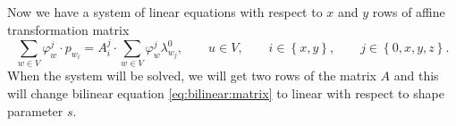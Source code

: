 Now we have a system of linear equations
with respect to $x$ and $y$ rows of affine transformation matrix
\begin{equation*}
  \sum\limits_{w \in V} \varphi_w^j \cdot p_{w_i}
  = A_i^j \cdot \sum\limits_{w \in V} \varphi_w^j \lambda^0_{w_j},
  \qquad u \in V,
  \qquad i \in \left\{ x, y \right\},
  \qquad j \in \left\{ 0, x, y, z \right\}.
\end{equation*}
When the system will be solved,
we will get two rows of the matrix $A$
and this will change bilinear equation \eqref{eq:bilinear:matrix}
to linear with respect to shape parameter $s$.
